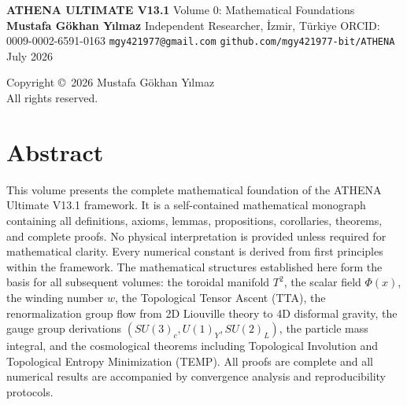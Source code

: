 \documentclass[12pt,oneside]{book}
\begin{document}
\frontmatter

\begin{titlepage}
\centering
\vspace*{1cm}
{\Huge\bfseries ATHENA ULTIMATE V13.1}
\vspace{0.5cm}
{\Large Volume 0: Mathematical Foundations}
\vspace{2cm}
{\Large \textbf{Mustafa Gökhan Yılmaz}}
\vspace{0.3cm}
{\large Independent Researcher, İzmir, Türkiye}
\vspace{0.2cm}
{\large ORCID: 0009-0002-6591-0163}
\vspace{0.2cm}
{\large \texttt{mgy421977@gmail.com}}
\vspace{0.2cm}
{\large \texttt{github.com/mgy421977-bit/ATHENA}}
\vspace{2cm}
{\large July 2026}
\vfill
\end{titlepage}

\newpage
\thispagestyle{empty}
\vspace*{\fill}
\begin{center}
Copyright \copyright\ 2026 Mustafa Gökhan Yılmaz\\
All rights reserved.
\end{center}
\vspace*{\fill}

\chapter*{Abstract}

This volume presents the complete mathematical foundation of the ATHENA Ultimate V13.1 framework. It is a self-contained mathematical monograph containing all definitions, axioms, lemmas, propositions, corollaries, theorems, and complete proofs. No physical interpretation is provided unless required for mathematical clarity. Every numerical constant is derived from first principles within the framework. The mathematical structures established here form the basis for all subsequent volumes: the toroidal manifold $T^2$, the scalar field $\Phi(x)$, the winding number $w$, the Topological Tensor Ascent (TTA), the renormalization group flow from 2D Liouville theory to 4D disformal gravity, the gauge group derivations $(SU(3)_c, U(1)_Y, SU(2)_L)$, the particle mass integral, and the cosmological theorems including Topological Involution and Topological Entropy Minimization (TEMP). All proofs are complete and all numerical results are accompanied by convergence analysis and reproducibility protocols.
\end{document}

